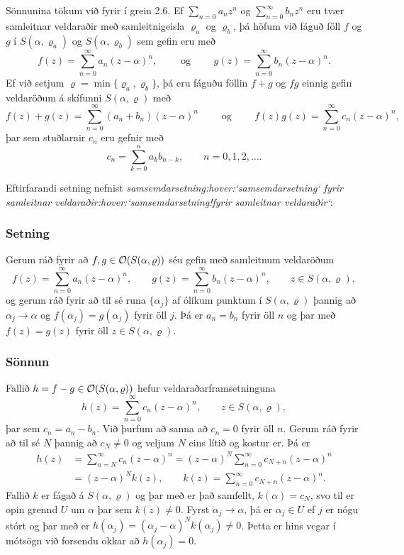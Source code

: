 Sönnunina tökum við fyrir í grein  2.6.  Ef $\sum_{n=0}a_nz^n$ og
$\sum_{n=0}^\infty b_nz^n$ eru tvær samleitnar veldaraðir með
samleitnigeisla $\varrho_a$ og $\varrho_b$, þá höfum við fáguð föll
$f$ og $g$ í $S(\alpha,\varrho_a)$ og $S(\alpha,\varrho_b)$ sem gefin
eru með 
$$
f(z)=\sum_{n=0}^\infty a_n(z-\alpha)^n, \qquad \text{ og } \qquad
g(z)=\sum_{n=0}^\infty b_n(z-\alpha)^n.
$$
Ef við setjum $\varrho=\min\{\varrho_a,\varrho_b\}$, þá eru fáguðu
föllin $f+g$ og $fg$ einnig gefin veldaröðum á skífunni
$S(\alpha,\varrho)$ með
$$
f(z)+g(z)=\sum_{n=0}^\infty (a_n+b_n)(z-\alpha)^n 
\qquad \text{ og } \qquad f(z)g(z)=\sum_{n=0}^\infty c_n(z-\alpha)^n,
$$
þar sem stuðlarnir $c_n$ eru gefnir með
$$
c_n=\sum_{k=0}^n a_kb_{n-k}, \qquad n=0,1,2,\dots. 
$$

Eftirfarandi setning nefnist {\it
samsemdarsetning:hover:`samsemdarsetning` fyrir samleitnar
veldaraðir:hover:`samsemdarsetning!fyrir samleitnar veldaraðir`}: 

\subsubsection{Setning}
Gerum ráð fyrir að $f,g\in {\cal O}(S(\alpha,\varrho))$ séu gefin með
samleitnum veldaröðum
 $$f(z)=\sum\limits_{n=0}^\infty a_n(z-\alpha)^n, \qquad
g(z)=\sum\limits_{n=0}^\infty b_n(z-\alpha)^n, \qquad
z\in S(\alpha,\varrho),
 $$
og gerum ráð fyrir að til sé runa $\{\alpha_j\}$ af ólíkum punktum
í $S(\alpha,\varrho)$ þannig að $\alpha_j\to \alpha$ og
$f(\alpha_j)=g(\alpha_j)$ fyrir öll $j$.  Þá er $a_n=b_n$ fyrir öll
$n$ og þar með $f(z)=g(z)$ fyrir öll $z\in S(\alpha,\varrho)$.
 
 
\subsubsection{Sönnun}
Fallið $h=f-g\in {\cal O}(S(\alpha,\varrho))$ hefur
veldaraðar\-fram\-setninguna
 $$h(z)=\sum\limits_{n=0}^\infty c_n(z-\alpha)^n, \qquad z\in
S(\alpha,\varrho), 
 $$
þar sem $c_n=a_n-b_n$.  Við þurfum að sanna að $c_n=0$ fyrir öll $n$.
  Gerum ráð fyrir að til sé $N$ þannig að $c_N\neq 0$ og veljum $N$
eins lítið og kostur er.  Þá er 
\begin{align*}
h(z)&= \sum\limits_{n=N}^\infty c_n(z-\alpha)^n = 
(z-\alpha)^N\sum\limits_{n=0}^\infty c_{N+n}(z-\alpha)^n\\
&= (z-\alpha)^N k(z), \qquad 
k(z) = \sum\limits_{n=0}^\infty c_{N+n}(z-\alpha)^n.
\end{align*}
Fallið $k$ er fágað á $S(\alpha,\varrho)$ og þar með er það samfellt,
$k(\alpha)=c_{N}$, svo til er opin grennd $U$ um $\alpha$ þar sem
$k(z)\neq 0$.  Fyrst $\alpha_j\to \alpha$, þá er $\alpha_j\in U$ ef
$j$ er nógu stórt og þar með er
$h(\alpha_j)=(\alpha_j-\alpha)^Nk(\alpha_j)\neq 0$.  Þetta er hins
vegar í mótsögn við forsendu okkar að $h(\alpha_j)=0$.  



